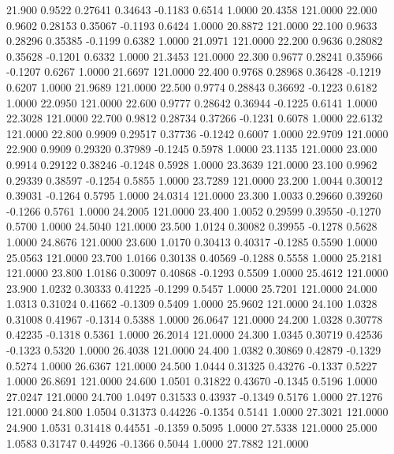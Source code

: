   21.900   0.9522   0.27641   0.34643  -0.1183   0.6514   1.0000  20.4358 121.0000
  22.000   0.9602   0.28153   0.35067  -0.1193   0.6424   1.0000  20.8872 121.0000
  22.100   0.9633   0.28296   0.35385  -0.1199   0.6382   1.0000  21.0971 121.0000
  22.200   0.9636   0.28082   0.35628  -0.1201   0.6332   1.0000  21.3453 121.0000
  22.300   0.9677   0.28241   0.35966  -0.1207   0.6267   1.0000  21.6697 121.0000
  22.400   0.9768   0.28968   0.36428  -0.1219   0.6207   1.0000  21.9689 121.0000
  22.500   0.9774   0.28843   0.36692  -0.1223   0.6182   1.0000  22.0950 121.0000
  22.600   0.9777   0.28642   0.36944  -0.1225   0.6141   1.0000  22.3028 121.0000
  22.700   0.9812   0.28734   0.37266  -0.1231   0.6078   1.0000  22.6132 121.0000
  22.800   0.9909   0.29517   0.37736  -0.1242   0.6007   1.0000  22.9709 121.0000
  22.900   0.9909   0.29320   0.37989  -0.1245   0.5978   1.0000  23.1135 121.0000
  23.000   0.9914   0.29122   0.38246  -0.1248   0.5928   1.0000  23.3639 121.0000
  23.100   0.9962   0.29339   0.38597  -0.1254   0.5855   1.0000  23.7289 121.0000
  23.200   1.0044   0.30012   0.39031  -0.1264   0.5795   1.0000  24.0314 121.0000
  23.300   1.0033   0.29660   0.39260  -0.1266   0.5761   1.0000  24.2005 121.0000
  23.400   1.0052   0.29599   0.39550  -0.1270   0.5700   1.0000  24.5040 121.0000
  23.500   1.0124   0.30082   0.39955  -0.1278   0.5628   1.0000  24.8676 121.0000
  23.600   1.0170   0.30413   0.40317  -0.1285   0.5590   1.0000  25.0563 121.0000
  23.700   1.0166   0.30138   0.40569  -0.1288   0.5558   1.0000  25.2181 121.0000
  23.800   1.0186   0.30097   0.40868  -0.1293   0.5509   1.0000  25.4612 121.0000
  23.900   1.0232   0.30333   0.41225  -0.1299   0.5457   1.0000  25.7201 121.0000
  24.000   1.0313   0.31024   0.41662  -0.1309   0.5409   1.0000  25.9602 121.0000
  24.100   1.0328   0.31008   0.41967  -0.1314   0.5388   1.0000  26.0647 121.0000
  24.200   1.0328   0.30778   0.42235  -0.1318   0.5361   1.0000  26.2014 121.0000
  24.300   1.0345   0.30719   0.42536  -0.1323   0.5320   1.0000  26.4038 121.0000
  24.400   1.0382   0.30869   0.42879  -0.1329   0.5274   1.0000  26.6367 121.0000
  24.500   1.0444   0.31325   0.43276  -0.1337   0.5227   1.0000  26.8691 121.0000
  24.600   1.0501   0.31822   0.43670  -0.1345   0.5196   1.0000  27.0247 121.0000
  24.700   1.0497   0.31533   0.43937  -0.1349   0.5176   1.0000  27.1276 121.0000
  24.800   1.0504   0.31373   0.44226  -0.1354   0.5141   1.0000  27.3021 121.0000
  24.900   1.0531   0.31418   0.44551  -0.1359   0.5095   1.0000  27.5338 121.0000
  25.000   1.0583   0.31747   0.44926  -0.1366   0.5044   1.0000  27.7882 121.0000
